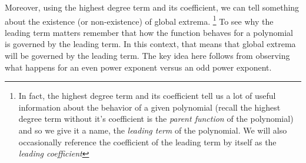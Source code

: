 \documentclass{ximeraXloud}
\begin{document}
        
        Moreover, using the highest degree term and its coefficient, we can tell something about the existence (or non-existence) of global extrema.%
        \footnote{In fact, the highest degree term and its coefficient tell us a lot of useful information about the behavior of a given polynomial (recall the highest degree term without it's coefficient is the \textit{parent function} of the polynomial) and so we give it a name, the \textit{leading term} of the polynomial. We will also occasionally reference the coefficient of the leading term by itself as the \textit{leading coefficient}}
        To see why the leading term matters remember that how the function behaves for a polynomial is governed by the leading term. In this context, that means that global extrema will be governed by the leading term. The key idea here follows from observing what happens for an even power exponent versus an odd power exponent.
%
%
%
%
\end{document}
